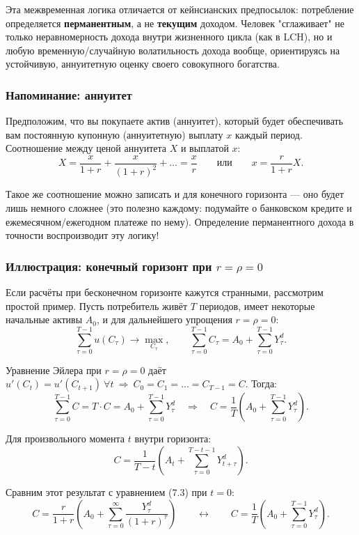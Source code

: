\documentclass[10pt,a4paper]{article}
\begin{document}
\begin{intuition}
Эта межвременная логика отличается от кейнсианских предпосылок: потребление определяется \textbf{перманентным}, а не \textbf{текущим} доходом. Человек "сглаживает" не только неравномерность дохода внутри жизненного цикла (как в LCH), но и любую временную/случайную волатильность дохода вообще, ориентируясь на устойчивую, аннуитетную оценку своего совокупного богатства.
\end{intuition}

\subsubsection{Напоминание: аннуитет}

Предположим, что вы покупаете актив (аннуитет), который будет обеспечивать вам постоянную купонную (аннуитетную) выплату $x$ каждый период. Соотношение между ценой аннуитета $X$ и выплатой $x$:
$$X = \frac{x}{1+r} + \frac{x}{(1+r)^2} + \dots = \frac{x}{r} \qquad \text{или} \qquad x = \frac{r}{1+r}X.$$

Такое же соотношение можно записать и для конечного горизонта — оно будет лишь немного сложнее (это полезно каждому: подумайте о банковском кредите и ежемесячном/ежегодном платеже по нему). Определение перманентного дохода в точности воспроизводит эту логику!

\subsubsection{Иллюстрация: конечный горизонт при $r=\rho=0$}

Если расчёты при бесконечном горизонте кажутся странными, рассмотрим простой пример. Пусть потребитель живёт $T$ периодов, имеет некоторые начальные активы $A_0$, и для дальнейшего упрощения $r=\rho=0$:
$$\sum_{\tau=0}^{T-1} u(C_\tau) \to \max_{C_\tau}, \qquad \sum_{\tau=0}^{T-1} C_\tau = A_0 + \sum_{\tau=0}^{T-1} Y_\tau^{d}.$$

Уравнение Эйлера при $r=\rho=0$ даёт $u'(C_t)=u'(C_{t+1})\ \forall t\ \Rightarrow\ C_0=C_1=\dots=C_{T-1}=C$. Тогда:
$$\sum_{\tau=0}^{T-1} C = T\cdot C = A_0 + \sum_{\tau=0}^{T-1}Y_\tau^{d} \quad\Rightarrow\quad C = \frac{1}{T}\left(A_0 + \sum_{\tau=0}^{T-1}Y_\tau^{d}\right).$$

Для произвольного момента $t$ внутри горизонта:
$$C = \frac{1}{T-t}\left(A_t + \sum_{\tau=0}^{T-t-1}Y_{t+\tau}^{d}\right).$$

Сравним этот результат с уравнением (7.3) при $t=0$:
$$C = \frac{r}{1+r}\left(A_0 + \sum_{\tau=0}^{\infty}\frac{Y_\tau^{d}}{(1+r)^\tau}\right) \qquad \longleftrightarrow \qquad C = \frac{1}{T}\left(A_0+\sum_{\tau=0}^{T-1}Y_\tau^{d}\right).$$
\end{document}
